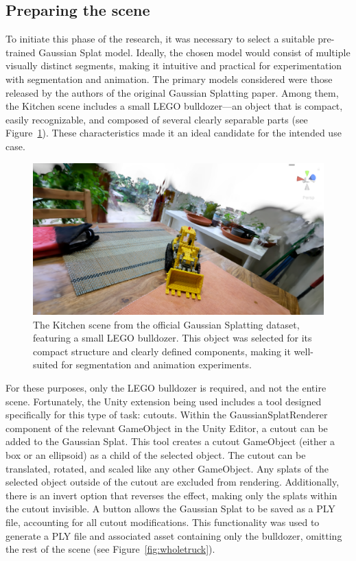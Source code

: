 \documentclass[12pt]{article}
\begin{document}
\subsection{Preparing the scene}
To initiate this phase of the research, it was necessary to select a suitable pre-trained Gaussian Splat model. Ideally, the chosen model would consist of multiple visually distinct segments, making it intuitive and practical for experimentation with segmentation and animation. The primary models considered were those released by the authors of the original Gaussian Splatting paper. Among them, the Kitchen scene includes a small LEGO bulldozer—an object that is compact, easily recognizable, and composed of several clearly separable parts (see Figure~\ref{fig:kitchen}). These characteristics made it an ideal candidate for the intended use case.
\begin{figure}[h!]
	\centering
	\includegraphics[width=\textwidth]{Images/Kitchen.png}
	\caption{The Kitchen scene from the official Gaussian Splatting dataset, featuring a small LEGO bulldozer. This object was selected for its compact structure and clearly defined components, making it well-suited for segmentation and animation experiments.}
	\label{fig:kitchen}
\end{figure}
\FloatBarrier
\noindent
For these purposes, only the LEGO bulldozer is required, and not the entire scene. Fortunately, the Unity extension being used includes a tool designed specifically for this type of task: cutouts. Within the GaussianSplatRenderer component of the relevant GameObject in the Unity Editor, a cutout can be added to the Gaussian Splat. This tool creates a cutout GameObject (either a box or an ellipsoid) as a child of the selected object. The cutout can be translated, rotated, and scaled like any other GameObject. Any splats of the selected object outside of the cutout are excluded from rendering. Additionally, there is an invert option that reverses the effect, making only the splats within the cutout invisible. A button allows the Gaussian Splat to be saved as a PLY file, accounting for all cutout modifications. This functionality was used to generate a PLY file and associated asset containing only the bulldozer, omitting the rest of the scene (see Figure~\ref{fig:wholetruck}).
\end{document}
